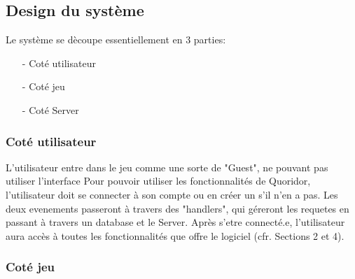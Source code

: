 \subsection{Design du système}
    Le système se dècoupe essentiellement en 3 parties:
    \begin{itemize}
        \item[-] Coté utilisateur
        \item[-] Coté jeu
        \item[-] Coté Server   
    \end{itemize}
    \subsubsection{Coté utilisateur}
        L'utilisateur entre dans le jeu comme une sorte de "Guest",
        ne pouvant pas utiliser l'interface
        Pour pouvoir utiliser les fonctionnalités de Quoridor, l'utilisateur doit se connecter
        à son compte ou en créer un s'il n'en a pas. Les deux evenements passeront à travers des "handlers", qui
        géreront les requetes en passant à travers un database et le Server. Après s'etre connecté.e, l'utilisateur aura accès à toutes les fonctionnalités
        que offre le logiciel (cfr. Sections 2 et 4).
    \subsubsection{Coté jeu}
    

